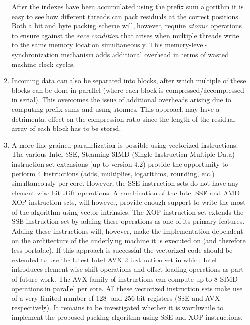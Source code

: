 \begin{enumerate}
 After the indexes have been accumulated using the prefix sum algorithm it is easy to see how different threads can pack residuals at the correct positions. Both a bit and byte
 packing scheme will, however, require \textit{atomic} operations to ensure against the \textit{race condition} that arises when multiple threads write to the same memory 
 location simultaneously. This memory-level-synchronization mechanism adds additional overhead in terms of wasted machine clock cycles.
 \item Incoming data can also be separated into blocks, after which multiple of these blocks can be done in parallel (where each block is compressed/decompressed in serial). This overcomes the issue of 
 additional overheads arising due to computing prefix sums and using atomics. This approach may have a detrimental effect on the compression ratio since the length of the residual array of each block 
 has to be stored.
 \item A more fine-grained parallelization is possible using vectorized instructions. The various Intel SSE, Steaming SIMD (Single Instruction Multiple Data) instruction set extensions (up to version 4.2) provide
 the opportunity to perform 4 instructions (adds, multiplies, logarithms, rounding, etc.) simultaneously per core. However, the SSE instruction sets do not have any element-wise bit-shift operations. A combination 
 of the Intel SSE and AMD XOP instruction sets, will however, provide enough support to write the most of the algorithm using vector intrinsics. The XOP instruction set extends the SSE instruction set by adding these 
 operations as one of its primary features. Adding these instructions will, however, make the implementation dependent on the architecture of the underlying machine it is executed on (and therefore less portable). 
 If this approach is successful the vectorized code should be extended to use the latest Intel AVX 2 instruction set in which Intel introduces element-wise shift operations and offset-loading operations as part of 
 future work. The AVX family of instructions can compute up to 8 SIMD operations in parallel per core. All these vectorized instruction sets make use of a very limited number of 128- and 256-bit registers (SSE and 
 AVX respectively). It remains to be investigated whether it is worthwhile to implement the proposed packing algorithm using SSE and XOP instructions.
\end{enumerate}
